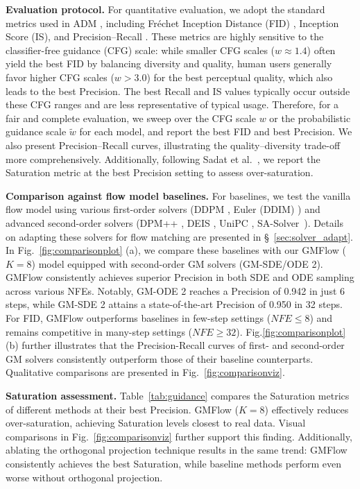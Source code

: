 \documentclass{article}
\theoremstyle{custom}
\theoremstyle{definition}
\theoremstyle{remark}
\newcommand{\methodname}{{GMFlow}}
\begin{document}
\textbf{Evaluation protocol.}
For quantitative evaluation, we adopt the standard metrics used in ADM \cite{dhariwal2021diffusion}, including Fréchet Inception Distance (FID) \cite{FID}, Inception Score (IS), and Precision–Recall \cite{prmetric}. These metrics are highly sensitive to the classifier-free guidance (CFG) scale: while smaller CFG scales ($w\approx 1.4$) often yield the best FID by balancing diversity and quality, human users generally favor higher CFG scales ($w > 3.0$) for the best perceptual quality, which also leads to the best Precision. The best Recall and IS values typically occur outside these CFG ranges and are less representative of typical usage. Therefore, for a fair and complete evaluation,  we sweep over the CFG scale $w$ or the probabilistic guidance scale $\tilde{w}$ for each model, and report the best FID and best Precision. We also present Precision--Recall curves, illustrating the quality--diversity trade-off more comprehensively. Additionally, following Sadat et al.~, we report the Saturation metric at the best Precision setting to assess over-saturation.

\textbf{Comparison against flow model baselines.} 
For baselines, we test the vanilla flow model using various first-order solvers (DDPM \cite{ddpm}, Euler (DDIM) \cite{ddim}) and advanced second-order solvers (DPM++ \cite{dpmpp}, DEIS \cite{deis}, UniPC \cite{unipc}, SA-Solver~\cite{sasolver}). Details on adapting these solvers for flow matching are presented in \S~\ref{sec:solver_adapt}.
In Fig.~\ref{fig:comparisonplot} (a), we compare these baselines with our GMFlow ($K=8$) model equipped with second-order GM solvers (GM-SDE/ODE 2).
\methodname{} consistently achieves superior Precision in both SDE and ODE sampling across various NFEs. Notably, GM-ODE 2 reaches a Precision of 0.942 in just 6 steps, while GM-SDE 2 attains a state-of-the-art Precision of 0.950 in 32 steps. For FID, \methodname{} outperforms baselines in few-step settings ($\mathit{NFE} \leq 8$) and remains competitive in many-step settings ($\mathit{NFE} \geq 32$).  
Fig.\ref{fig:comparisonplot} (b) further illustrates that the Precision-Recall curves of first- and second-order GM solvers consistently outperform those of their baseline counterparts. Qualitative comparisons are presented in Fig.~\ref{fig:comparisonviz}.

\textbf{Saturation assessment.} 
Table~\ref{tab:guidance} compares the Saturation metrics of different methods at their best Precision. \methodname{} ($K=8$) effectively reduces over-saturation, achieving Saturation levels closest to real data. Visual comparisons in Fig.~\ref{fig:comparisonviz} further support this finding. Additionally, ablating the orthogonal projection technique results in the same trend: GMFlow consistently achieves the best Saturation, while baseline methods perform even worse without orthogonal projection.
\end{document}
